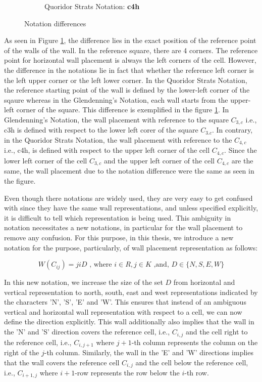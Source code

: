 \begin{figure}[h]
\begin{subfigure}{0.4\textwidth}
      \caption{Quoridor Strats Notation: \textbf{c4h}}
    \end{subfigure}
    \caption{Notation differences}
    \label{fig:WallNotationsDifferent}
\end{figure}

As seen in Figure \ref{fig:WallNotationsDifferent}, the difference lies in the exact position of the reference point of the walls of the wall. In the reference square, there are 4 corners. The reference point for horizontal wall placement is always the left corners of the cell. However, the difference in the notations lie in fact that whether the reference left corner is the left upper corner or the left lower corner. In the Quoridor Strats Notation, the reference starting point of the wall  is defined by the lower-left corner of the sqaure whereas in the Glendenning's Notation, each wall starts from the upper-left corner of the square. This difference is exemplified in the figure \ref{fig:WallNotationsDifferent}. In Glendenning's Notation, the wall placement with reference to the square $C_{3, c}$ i.e., c3h is defined with respect to the lower left corer of the square $C_{3. c}$. In contrary, in the Quoridor Strats Notation, the wall placement with reference to the $C_{4,c}$ i.e., c4h, is defined with respect to the upper left corner of the cell $C_{4,c}$. Since the lower left corner of the cell $C_{3,c}$ and the upper left corner of the cell $C_{4,c}$ are the same, the wall placement due to the notation difference were the same as seen in the figure.

Even though there notations are widely used, they are very easy to get confused with since they have the same wall representations,
and unless specified explicitly, it is difficult to tell which representation is being used. This ambiguity in notation necessitates a new notations, in particular for the wall placement to remove any confusion. For this purpose, in this thesis, we introduce a new notation for the purpose, particularly, of wall placement representation as follows:

\begin{equation}\label{eqn:Wall2}
W(C_{ij}) = jiD \text{ , where } i \in R, j \in K \text{ ,and, } D \in \{N, S, E, W\}    
\end{equation}

In this new notation, we increase the size of the set $D$ from horizontal and vertical representation to north, south, east and west representations indicated by the characters 'N', 'S', 'E' and 'W'. This ensures that instead of an ambiguous vertical and horizontal wall representation with  respect to a cell, we can now define the direction explicitly. This wall additionally also implies that the wall in the 'N' and 'S' direction covers the reference cell, i.e., $C_{i, j}$ and the cell right to the reference cell, i.e., $C_{i, j+1}$ where $j+1$-th column represents the column on the right of the $j$-th column. Similarly, the wall in the 'E' and 'W' directions implies that the wall covers the reference cell $C_{i, j}$ and the cell below the reference cell, i.e., $C_{i+1, j}$ where $i+1$-row represents the row below the $i$-th row.

